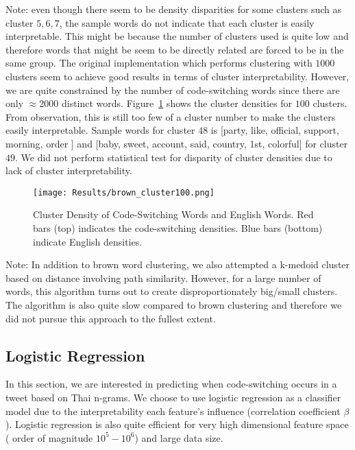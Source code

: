\documentclass[conference]{IEEEtran}
\begin{document}
Note: even though there seem to be density disparities for some clusters such as cluster $5,6,7$, the sample words do not indicate that each cluster is easily interpretable. This might be because the number of clusters used is quite low and therefore words that might be seem to be directly related are forced to be in the same group. The original implementation which performs clustering with $1000$ clusters seem to achieve good results in terms of cluster interpretability. However,  we are quite constrained by the number of code-switching words since there are only $\approx 2000$ distinct words. Figure~\ref{fig:brown100} shows the cluster densities for $100$ clusters. From observation, this is still too few of a cluster number to make the clusters easily interpretable. Sample words for cluster $48$ is [party,  like, official,  support,  morning,  order ] and [baby, sweet,  account, said, country,  1st,  colorful] for cluster $49$. We did not perform statistical test for disparity of cluster densities due to lack of cluster interpretability.



\begin{figure}[H]
	\centering
	\texttt{[image: Results/brown\_cluster100.png]}
	\caption{Cluster Density of Code-Switching Words and English Words. Red bars (top) indicates the code-switching densities. Blue bars (bottom) indicate English densities.}
	\label{fig:brown100}
\end{figure}


Note: In addition to brown word clustering, we also attempted a k-medoid cluster based on distance involving path similarity. However, for a large number of words, this algorithm turns out to create disproportionately big/small clusters. The algorithm is also quite slow compared to brown clustering and therefore we did not pursue this approach to the fullest extent. 



\subsection{Logistic Regression}
In this section, we are interested in predicting when code-switching occurs in a tweet based on Thai n-grams.  We choose to use logistic regression as a classifier model due to the interpretability each feature's influence (correlation coefficient $\beta$).  Logistic regression is also quite efficient for very high dimensional feature space ( order of magnitude $10^5 - 10^6$) and large data size. 
\end{document}
